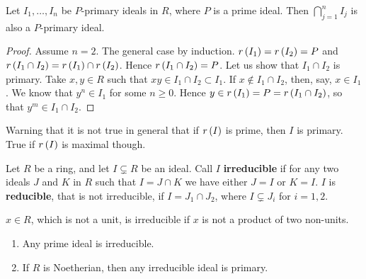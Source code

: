 \begin{lemma}
\label{lem:11.4}
Let $ I_1, \dots, I_n $ be $ P $-primary ideals in $ R $, where $ P $ is a prime ideal. Then $ \bigcap_{j = 1}^n I_j $ is also a $ P $-primary ideal.
\end{lemma}

\begin{proof}
Assume $ n = 2 $. The general case by induction. $ r\br{I_1} = r\br{I_2} = P $ and $ r\br{I_1 \cap I_2} = r\br{I_1} \cap r\br{I_2} $. Hence $ r\br{I_1 \cap I_2} = P $. Let us show that $ I_1 \cap I_2 $ is primary. Take $ x, y \in R $ such that $ xy \in I_1 \cap I_2 \subset I_1 $. If $ x \notin I_1 \cap I_2 $, then, say, $ x \in I_1 $. We know that $ y^n \in I_1 $ for some $ n \ge 0 $. Hence $ y \in r\br{I_1} = P = r\br{I_1 \cap I_2} $, so that $ y^m \in I_1 \cap I_2 $.
\end{proof}

Warning that it is not true in general that if $ r\br{I} $ is prime, then $ I $ is primary. True if $ r\br{I} $ is maximal though.

\pagebreak


\begin{definition}
Let $ R $ be a ring, and let $ I \subsetneq R $ be an ideal. Call $ I $ \textbf{irreducible} if for any two ideals $ J $ and $ K $ in $ R $ such that $ I = J \cap K $ we have either $ J = I $ or $ K = I $. $ I $ is \textbf{reducible}, that is not irreducible, if $ I = J_1 \cap J_2 $, where $ I \subsetneq J_i $ for $ i = 1, 2 $.
\end{definition}

\begin{note*}
$ x \in R $, which is not a unit, is irreducible if $ x $ is not a product of two non-units.
\end{note*}

\begin{proposition}
\label{prop:11.5}
\hfill
\begin{enumerate}
\item Any prime ideal is irreducible.
\item If $ R $ is Noetherian, then any irreducible ideal is primary.
\end{enumerate}
\end{proposition}

